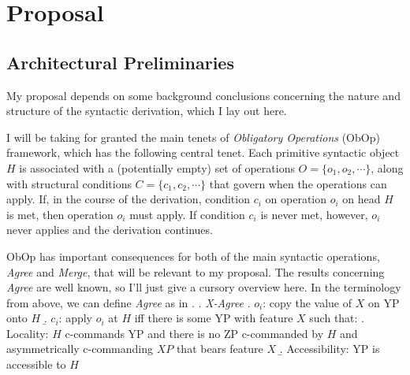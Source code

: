 \documentclass[11pt, letterpaper]{paper_nick}
\begin{document}
\begin{comment}
\end{itemize}
\item \underline{Feature-driven merge} (\citealt{adger03}; \citealt{collins03}; \citealt{lechner04}; \citealt{kobele06}; \citealt{pesetsky07}; \citealt{muller10})
\begin{itemize}
\item Unify \emph{Agree}, \emph{Internal Merge}, \emph{External Merge} as feature driven operations
\item Two types of features:
\begin{itemize}
\item Structure building, which triggers \emph{Merge}: [$\circ$ F $\circ$] 
\item Probing, which triggers \emph{Agree}: [$*$ F $*$] 
\end{itemize}
\end{itemize}
\end{enumerate}
\end{comment}

\section{Proposal}
\subsection{Architectural Preliminaries}
My proposal depends on some background conclusions concerning the nature and structure of the syntactic derivation, which I lay out here. 

I will be taking for granted the main tenets of  \emph{Obligatory Operations} (ObOp) framework, which has the following central tenet. Each primitive syntactic object $H$ is associated with a (potentially empty) set of operations $O=\{o_1, o_2, \cdots\}$, along with structural conditions $C=\{c_1, c_2, \cdots\}$ that govern when the operations can apply. If, in the course of the derivation, condition $c_i$ on operation $o_i$ on head $H$ is met, then operation $o_i$ must apply. If condition $c_i$ is never met, however, $o_i$ never applies and the derivation continues. %

ObOp has important consequences for both of the main syntactic operations, \emph{Agree} and \emph{Merge}, that will be relevant to my proposal. The results concerning \emph{Agree} are well known, so I'll just give a cursory overview here. In the terminology from above, we can define \emph{Agree} as in \Next.
\ex. \emph{X-Agree}
\a. $o_i$: copy the value of $X$ on YP onto $H$
\b. $c_i$: apply $o_i$ at $H$ iff there is some YP with feature $X$ such that:
\a. Locality: $H$ c-commands YP and there is no ZP c-commanded by $H$ and asymmetrically c-commanding $XP$ that bears feature $X$
\b. Accessibility: YP is accessible to $H$
\end{document}
